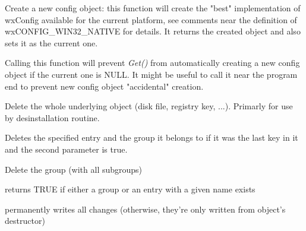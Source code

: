 
Create a new config object: this function will create the "best"
implementation of wxConfig available for the current platform, see comments
near the definition of wxCONFIG\_WIN32\_NATIVE for details. It returns the
created object and also sets it as the current one.

\label{wxconfigbasedontcreateondemand}


Calling this function will prevent {\it Get()} from automatically creating a
new config object if the current one is NULL. It might be useful to call it
near the program end to prevent new config object "accidental" creation.

\label{wxconfigbasedeleteall}


Delete the whole underlying object (disk file, registry key, ...). Primarly
for use by desinstallation routine.

\label{wxconfigbasedeleteentry}


Deletes the specified entry and the group it belongs to if it was the last key
in it and the second parameter is true.

\label{wxconfigbasedeletegroup}


Delete the group (with all subgroups)

\label{wxconfigbaseexists}


returns TRUE if either a group or an entry with a given name exists

\label{wxconfigbaseflush}


permanently writes all changes (otherwise, they're only written from object's
destructor)

\label{wxconfigbaseget}

